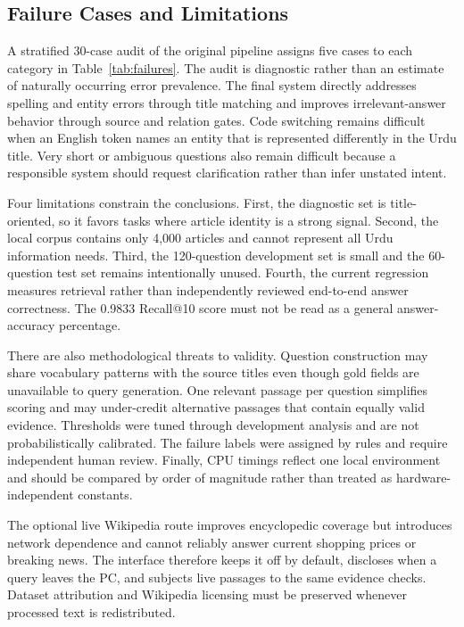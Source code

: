\documentclass[conference]{IEEEtran}
\begin{document}
\subsection{Failure Cases and Limitations}
A stratified 30-case audit of the original pipeline assigns five cases to each category in Table~\ref{tab:failures}. The audit is diagnostic rather than an estimate of naturally occurring error prevalence. The final system directly addresses spelling and entity errors through title matching and improves irrelevant-answer behavior through source and relation gates. Code switching remains difficult when an English token names an entity that is represented differently in the Urdu title. Very short or ambiguous questions also remain difficult because a responsible system should request clarification rather than infer unstated intent.

Four limitations constrain the conclusions. First, the diagnostic set is title-oriented, so it favors tasks where article identity is a strong signal. Second, the local corpus contains only 4,000 articles and cannot represent all Urdu information needs. Third, the 120-question development set is small and the 60-question test set remains intentionally unused. Fourth, the current regression measures retrieval rather than independently reviewed end-to-end answer correctness. The 0.9833 Recall@10 score must not be read as a general answer-accuracy percentage.

There are also methodological threats to validity. Question construction may share vocabulary patterns with the source titles even though gold fields are unavailable to query generation. One relevant passage per question simplifies scoring and may under-credit alternative passages that contain equally valid evidence. Thresholds were tuned through development analysis and are not probabilistically calibrated. The failure labels were assigned by rules and require independent human review. Finally, CPU timings reflect one local environment and should be compared by order of magnitude rather than treated as hardware-independent constants.

The optional live Wikipedia route improves encyclopedic coverage but introduces network dependence and cannot reliably answer current shopping prices or breaking news. The interface therefore keeps it off by default, discloses when a query leaves the PC, and subjects live passages to the same evidence checks. Dataset attribution and Wikipedia licensing must be preserved whenever processed text is redistributed.
\end{document}
